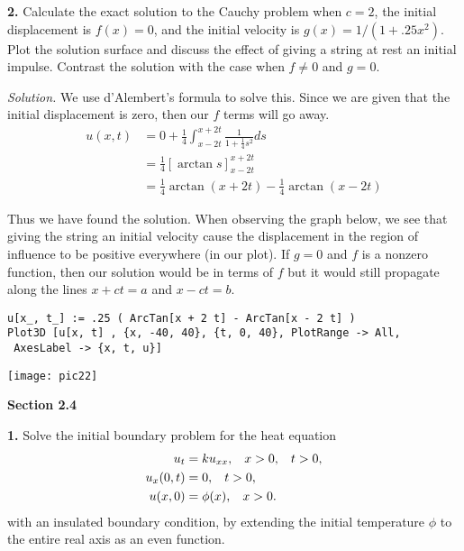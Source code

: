\documentclass{article}
\begin{document}
\newpage

\textbf{2.} Calculate the exact solution to the Cauchy problem when \(c=2\), the initial displacement is \(f(x)=0\), and the initial velocity is \( g(x) =1/(1+.25x^2) \). Plot the solution surface and discuss the effect of giving  a string at rest an initial impulse. Contrast the solution with the case when \(f \neq 0 \) and \( g=0 \). 

\vspace{3mm}
\textit{Solution.} We use d'Alembert's formula to solve this. Since we are given that the initial displacement is zero, then our \(f\) terms will go away. 
\begin{align*}
u(x,t) &= 0 + \frac{1}{4} \int_{x-2t}^{x+2t} \frac{1}{1+\frac{1}{4}s^2}ds \\
&= \frac{1}{4} \left[ \arctan s \right]_{x-2t}^{x+2t} \\
&=  \frac{1}{4} \arctan(x+2t) -  \frac{1}{4}\arctan(x-2t) 
\end{align*}

Thus we have found the solution. When observing the graph below, we see that giving the string an initial velocity cause the displacement in the region of influence to be positive everywhere (in our plot). If \(g=0\) and \(f\) is a nonzero function, then our solution would be in terms of \(f\) but it would still propagate along the lines \(x+ct=a \) and \( x-ct=b\). 
\begin{verbatim}
u[x_, t_] := .25 ( ArcTan[x + 2 t] - ArcTan[x - 2 t] )
Plot3D [u[x, t] , {x, -40, 40}, {t, 0, 40}, PlotRange -> All, 
 AxesLabel -> {x, t, u}]
\end{verbatim}

\begin{centering}
\texttt{[image: pic22]}
\end{centering}


\newpage
\textbf{Section 2.4}

\textbf{1.} Solve the initial boundary problem for the heat equation 
\begin{align*}
u_t &= ku_{xx},  \hspace{3mm} x >0,  \hspace{3mm} t>0 , \\
u_x(0,t) &= 0,  \hspace{3mm} t>0, \\
u(x,0) &= \phi(x),  \hspace{3mm} x>0. 
\end{align*} 
with an insulated boundary condition, by extending the initial temperature \(\phi\) to the entire real axis as an even function. 
\end{document}
